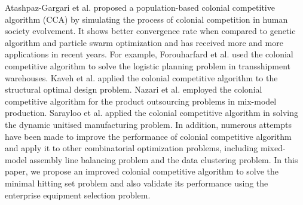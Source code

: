 Atashpaz-Gargari et al. proposed a population-based colonial competitive algorithm (CCA) by simulating the process of colonial competition in human society evolvement.
It shows better convergence rate when compared to genetic algorithm and particle swarm optimization and has received more and more applications in recent years.
For example, Forouharfard et al. used the colonial competitive algorithm to solve the logistic planning problem in transshipment warehouses.
Kaveh et al. applied the colonial competitive algorithm to the structural optimal design problem.
Nazari et al. employed the colonial competitive algorithm for the product outsourcing problems in mix-model production.
Sarayloo et al. applied the colonial competitive algorithm in solving the dynamic unitised manufacturing problem. 
In addition, numerous attempts have been made to improve the performance of colonial competitive algorithm and apply it to other combinatorial optimization problems, including mixed-model assembly line balancing problem and the data clustering problem.
In this paper, we propose an improved colonial competitive algorithm to solve the minimal hitting set problem and also validate its performance using the enterprise equipment selection problem.